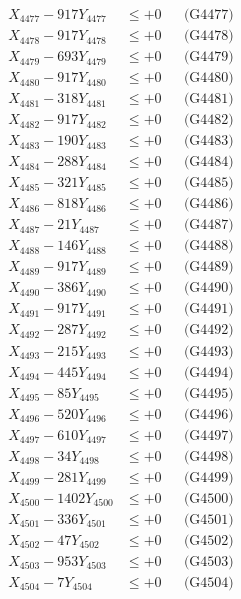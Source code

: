 \documentclass[a4paper,10pt]{article}
\begin{document}
{\begin{align}
X_{4477} - 917Y_{4477} &\leq +0 && \text{(G4477)} \\
X_{4478} - 917Y_{4478} &\leq +0 && \text{(G4478)} \\
X_{4479} - 693Y_{4479} &\leq +0 && \text{(G4479)} \\
X_{4480} - 917Y_{4480} &\leq +0 && \text{(G4480)} \\
\allowbreak
X_{4481} - 318Y_{4481} &\leq +0 && \text{(G4481)} \\
X_{4482} - 917Y_{4482} &\leq +0 && \text{(G4482)} \\
X_{4483} - 190Y_{4483} &\leq +0 && \text{(G4483)} \\
X_{4484} - 288Y_{4484} &\leq +0 && \text{(G4484)} \\
X_{4485} - 321Y_{4485} &\leq +0 && \text{(G4485)} \\
X_{4486} - 818Y_{4486} &\leq +0 && \text{(G4486)} \\
X_{4487} - 21Y_{4487} &\leq +0 && \text{(G4487)} \\
X_{4488} - 146Y_{4488} &\leq +0 && \text{(G4488)} \\
X_{4489} - 917Y_{4489} &\leq +0 && \text{(G4489)} \\
X_{4490} - 386Y_{4490} &\leq +0 && \text{(G4490)} \\
\allowbreak
X_{4491} - 917Y_{4491} &\leq +0 && \text{(G4491)} \\
X_{4492} - 287Y_{4492} &\leq +0 && \text{(G4492)} \\
X_{4493} - 215Y_{4493} &\leq +0 && \text{(G4493)} \\
X_{4494} - 445Y_{4494} &\leq +0 && \text{(G4494)} \\
X_{4495} - 85Y_{4495} &\leq +0 && \text{(G4495)} \\
X_{4496} - 520Y_{4496} &\leq +0 && \text{(G4496)} \\
X_{4497} - 610Y_{4497} &\leq +0 && \text{(G4497)} \\
X_{4498} - 34Y_{4498} &\leq +0 && \text{(G4498)} \\
X_{4499} - 281Y_{4499} &\leq +0 && \text{(G4499)} \\
X_{4500} - 1402Y_{4500} &\leq +0 && \text{(G4500)} \\
\allowbreak
X_{4501} - 336Y_{4501} &\leq +0 && \text{(G4501)} \\
X_{4502} - 47Y_{4502} &\leq +0 && \text{(G4502)} \\
X_{4503} - 953Y_{4503} &\leq +0 && \text{(G4503)} \\
X_{4504} - 7Y_{4504} &\leq +0 && \text{(G4504)} \\

\end{align}}
\end{document}

